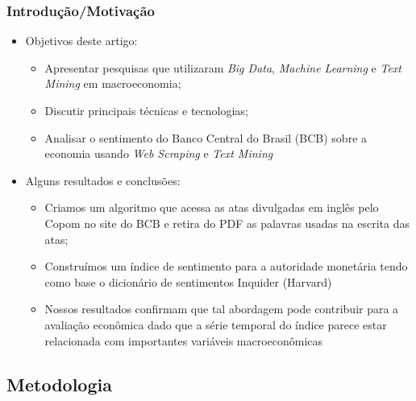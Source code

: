 \documentclass[aspectratio=169]{beamer}
\begin{document}
\begin{frame}\frametitle{Introdução/Motivação}
  \begin{itemize}
  \item Objetivos deste artigo:
    \begin{itemize}
      \item Apresentar pesquisas que utilizaram \emph{Big Data}, \emph{Machine Learning} e \emph{Text Mining} em macroeconomia;
      \item Discutir principais técnicas e tecnologias;
      \item Analisar o sentimento do Banco Central do Brasil (BCB) sobre a economia usando \emph{Web Scraping} e \emph{Text Mining}
    \end{itemize}
  \item Alguns resultados e conclusões:
    \begin{itemize}
      \item Criamos um algoritmo que acessa as atas divulgadas em inglês pelo Copom no site do BCB e retira do PDF as palavras usadas na escrita das atas;
      \item Construímos um índice de sentimento para a autoridade monetária tendo como base o dicionário de sentimentos Inquider (Harvard) 
      \item Nossos resultados confirmam que tal abordagem pode contribuir para a avaliação econômica dado que a série temporal do índice parece estar relacionada com importantes variáveis macroeconômicas
    \end{itemize}
  \end{itemize}
\end{frame}


\subsection{Metodologia}
\end{document}
